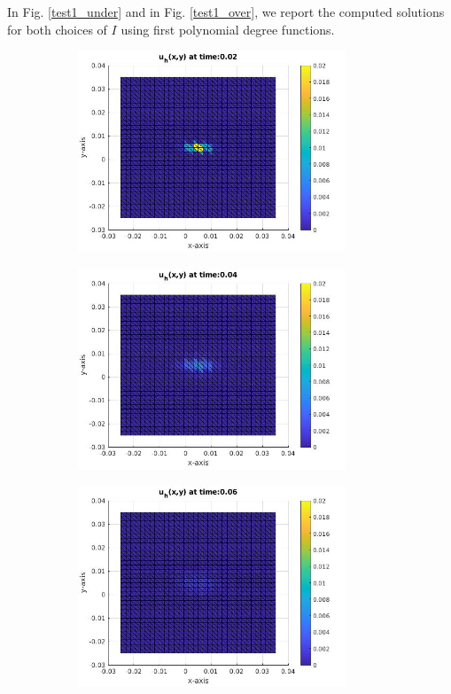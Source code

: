 \documentclass[a4paper,11pt]{article}
\begin{document}
\noindent In Fig. \ref{test1_under} and in Fig. \ref{test1_over}, we report the computed solutions for both choices of $I$ using first polynomial degree functions.
\newpage
{} 
\begin{figure}[h] \captionsetup{size = large} \caption{Test-case 1, computed snapshots underflow case ($I=500 \cdot 10^3$ A)} \label{test1_under}
	\centering
	\begin{subfigure}{0.4\textwidth}
		\includegraphics[width = 8cm]{./tc1-1/002.jpg}
	\end{subfigure}
	\begin{subfigure}{0.4\textwidth}
		\includegraphics[width =8cm]{./tc1-1/004.jpg}
	\end{subfigure}
	\begin{subfigure}{0.4\textwidth}
		\includegraphics[width = 8cm]{./tc1-1/006.jpg}

\end{subfigure}
\end{figure}
\end{document}

